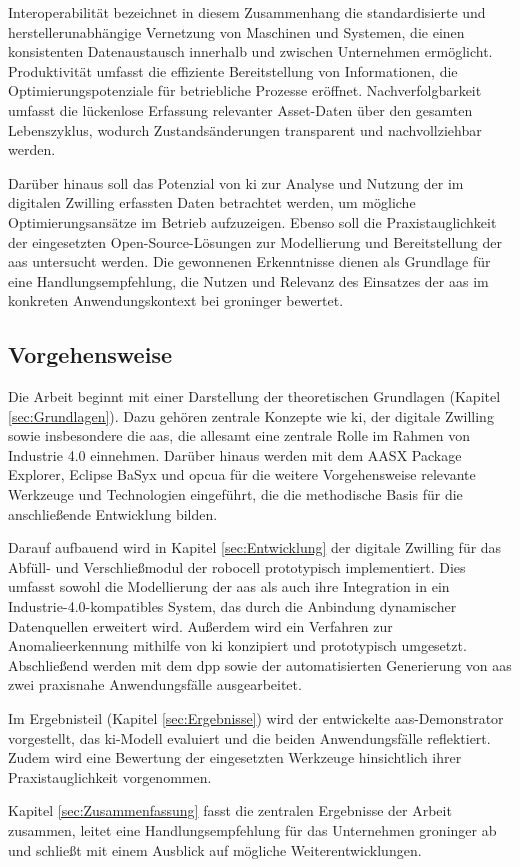 Interoperabilität bezeichnet in diesem Zusammenhang die standardisierte und hersteller\-unabhängige Vernetzung von Maschinen und Systemen, die einen konsistenten Datenaustausch innerhalb und zwischen Unternehmen ermöglicht. 
Produktivität umfasst die effiziente Bereitstellung von Informationen, die Optimierungspotenziale für betriebliche Prozesse eröffnet. 
Nachverfolgbarkeit umfasst die lückenlose Erfassung relevanter Asset-Daten über den gesamten Lebenszyklus, wodurch Zustandsänderungen transparent und nachvollziehbar werden.

Darüber hinaus soll das Potenzial von \acs{ki} zur Analyse und Nutzung der im digitalen Zwilling erfassten Daten betrachtet werden, um mögliche Optimierungsansätze im Betrieb aufzuzeigen. 
Ebenso soll die Praxistauglichkeit der eingesetzten Open-Source-Lösungen zur Modellierung und Bereitstellung der \acs{aas} untersucht werden.
Die gewonnenen Erkenntnisse dienen als Grundlage für eine Handlungsempfehlung, die Nutzen und Relevanz des Einsatzes der \acs{aas} im konkreten Anwendungskontext bei groninger bewertet.

\subsection{Vorgehensweise}

Die Arbeit beginnt mit einer Darstellung der theoretischen Grundlagen (Kapitel \ref{sec:Grundlagen}). 
Dazu gehören zentrale Konzepte wie \acs{ki}, der digitale Zwilling sowie insbesondere die \acs{aas}, die allesamt eine zentrale Rolle im Rahmen von Industrie 4.0 einnehmen. 
Darüber hinaus werden mit dem AASX Package Explorer, Eclipse BaSyx und \ac{opcua} für die weitere Vorgehensweise relevante Werkzeuge und Technologien eingeführt, die die methodische Basis für die anschließende Entwicklung bilden.

Darauf aufbauend wird in Kapitel \ref{sec:Entwicklung} der digitale Zwilling für das Abfüll- und Verschließmodul der robocell prototypisch implementiert. 
Dies umfasst sowohl die Modellierung der \acs{aas} als auch ihre Integration in ein Industrie-4.0-kompatibles System, das durch die Anbindung dynamischer Datenquellen erweitert wird. 
Außerdem wird ein Verfahren zur Anomalieerkennung mithilfe von \acs{ki} konzipiert und prototypisch umgesetzt. 
Abschließend werden mit dem \acs{dpp} sowie der automatisierten Generierung von \acs{aas} zwei praxisnahe Anwendungsfälle ausgearbeitet.

Im Ergebnisteil (Kapitel \ref{sec:Ergebnisse}) wird der entwickelte \acs{aas}-Demonstrator vorgestellt, das \acs{ki}-Modell evaluiert und die beiden Anwendungsfälle reflektiert. 
Zudem wird eine Bewertung der eingesetzten Werkzeuge hinsichtlich ihrer Praxistauglichkeit vorgenommen.

Kapitel \ref{sec:Zusammenfassung} fasst die zentralen Ergebnisse der Arbeit zusammen, leitet eine Handlungs\-empfehlung für das Unternehmen groninger ab und schließt mit einem Ausblick auf mögliche Weiterentwicklungen.
